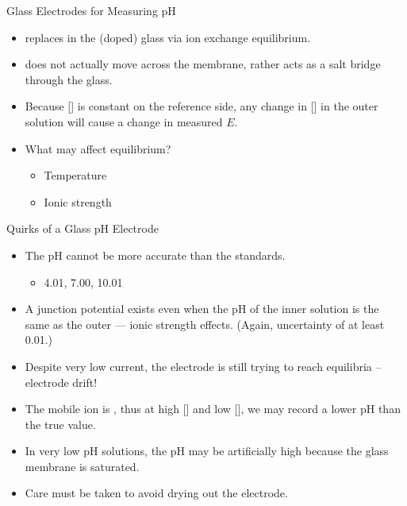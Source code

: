 \documentclass[notes=show]{beamer}
\begin{document}
\begin{frame}{Glass Electrodes for Measuring pH}
	\begin{itemize}
		\item {} replaces  in the (doped) glass via
			\alert{ion exchange equilibrium}.
		\item {} does not actually move across the membrane, rather
			 acts as a salt bridge through the glass.
		\item Because [] is constant on the reference side, any
			change in [] in the outer solution will cause a
			change in measured $E$.

			\bigskip

		\item What may affect equilibrium?
			\begin{itemize}
				\item<2-> Temperature
				\item<2-> Ionic strength
			\end{itemize}
	\end{itemize}
\end{frame}

\begin{frame}{Quirks of a Glass pH Electrode}
	\begin{itemize}
		\item The pH cannot be more accurate than the standards.
			\begin{itemize}
				\item 4.01, 7.00, 10.01
			\end{itemize}
		\item A junction potential exists even when the pH of the inner
			solution is the same as the outer --- ionic strength
			effects. (Again, uncertainty of at least \num{0.01}.)
		\item Despite very low current, the electrode is still trying to
			reach equilibria -- electrode drift!
		\item The mobile ion is , thus at high [] and
			low [], we may record a lower pH than the true
			value.
		\item In very low pH solutions, the pH may be artificially high
			because the glass membrane is \alert{saturated}.
		\item Care must be taken to avoid drying out the electrode.
	\end{itemize}
\end{frame}
\end{document}
